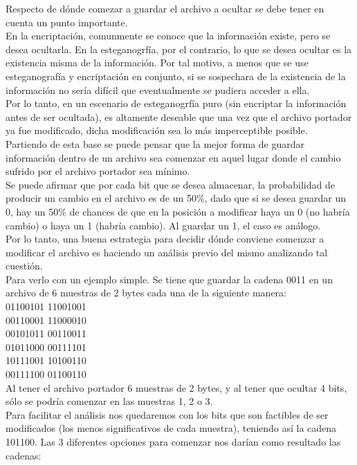 \documentclass{article}
\begin{document}
\noindent Respecto de dónde comezar a guardar el archivo a ocultar se debe tener en cuenta un punto importante.\\
En la encriptación, comunmente se conoce que la información existe, pero se desea ocultarla. En la esteganogrfía, por el contrario, lo que se desea ocultar es la existencia misma de la información. Por tal motivo, a menos que se use esteganografía y encriptación en conjunto, si se sospechara de la existencia de la información no sería difícil que eventualmente se pudiera acceder a ella.\\
Por lo tanto, en un escenario de esteganogrfía puro (sin encriptar la información antes de ser ocultada), es altamente deseable que una vez que el archivo portador ya fue modificado, dicha modificación sea lo más imperceptible posible.\\
Partiendo de esta base se puede pensar que la mejor forma de guardar información dentro de un archivo sea comenzar en aquel lugar donde el cambio sufrido por el archivo portador sea mínimo.\\
Se puede afirmar que por cada bit que se desea almacenar, la probabilidad de producir un cambio en el archivo es de un 50$\%$, dado que si se desea guardar un 0, hay un 50$\%$ de chances de que en la posición a modificar haya un 0 (no habría cambio) o haya un 1 (habría cambio). Al guardar un 1, el caso es análogo.\\
Por lo tanto, una buena estrategia para decidir dónde conviene comenzar a modificar el archivo es haciendo un análisis previo del mismo analizando tal cuestión.\\
Para verlo con un ejemplo simple. Se tiene que guardar la cadena 0011 en un archivo de 6 muestras de 2 bytes cada una de la siguiente manera: \\
01100101 11001001 \\
00110001 11000010 \\
00101011 00110011 \\
01011000 00111101 \\
10111001 10100110 \\
00111100 01100110 \\
Al tener el archivo portador 6 muestras de 2 bytes, y al tener que ocultar 4 bits, sólo se podría comenzar en las muestras 1, 2 o 3.\\
Para facilitar el análisis nos quedaremos con los bits que son factibles de ser modificados (los menos significativos de cada muestra), teniendo así la cadena 101100. Las 3 diferentes opciones para comenzar nos darían como resultado las cadenas: \\
\end{document}
